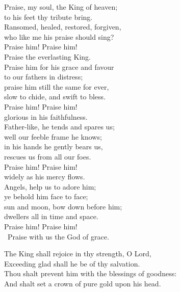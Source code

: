 {\vfill  



\vfill 


\begin{center}
	

Praise, my soul, the King of heaven;\\
to his feet thy tribute bring.\\
Ransomed, healed, restored, forgiven,\\
who like me his praise should sing?\\
Praise him! Praise him!\\
Praise the everlasting King.\\
Praise him for his grace and favour\\
to our fathers in distress;\\
praise him still the same for ever,\\
slow to chide, and swift to bless.\\
Praise him! Praise him!\\
glorious in his faithfulness.\\
Father-like, he tends and spares us;\\
well our feeble frame he knows;\\
in his hands he gently bears us,\\
rescues us from all our foes.\\
Praise him! Praise him!\\
widely as his mercy flows.\\
Angels, help us to adore him;\\
ye behold him face to face;\\
sun and moon, bow down before him;\\
dwellers all in time and space.\\
Praise him! Praise him!\\\
Praise with us the God of grace.
\end{center}
\clearpage 
{}


\begin{center}
	
The King shall rejoice in thy strength, O Lord,\\
Exceeding glad shall he be of thy salvation.\\
Thou shalt prevent him with the blessings of goodness:\\
And shalt set a crown of pure gold upon his head.
\end{center}


}
